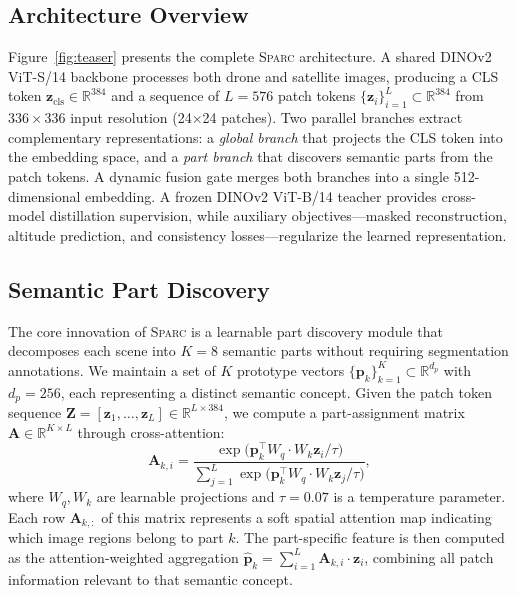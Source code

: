 \documentclass[sigconf, anonymous, review]{acmart}
\newcommand{\ours}{\textsc{Sparc}}
\newcommand{\reals}{\mathbb{R}}
\begin{document}
\subsection{Architecture Overview}
\label{sec:overview}

Figure~\ref{fig:teaser} presents the complete \ours{} architecture.
A shared DINOv2 ViT-S/14 backbone processes both drone and satellite images, producing a CLS token $\mathbf{z}_\text{cls} \in \reals^{384}$ and a sequence of $L{=}576$ patch tokens $\{\mathbf{z}_i\}_{i=1}^L \subset \reals^{384}$ from $336{\times}336$ input resolution (24${\times}$24 patches).
Two parallel branches extract complementary representations: a \emph{global branch} that projects the CLS token into the embedding space, and a \emph{part branch} that discovers semantic parts from the patch tokens.
A dynamic fusion gate merges both branches into a single 512-dimensional embedding.
A frozen DINOv2 ViT-B/14 teacher provides cross-model distillation supervision, while auxiliary objectives---masked reconstruction, altitude prediction, and consistency losses---regularize the learned representation.

\subsection{Semantic Part Discovery}
\label{sec:parts}

The core innovation of \ours{} is a learnable part discovery module that decomposes each scene into $K{=}8$ semantic parts without requiring segmentation annotations.
We maintain a set of $K$ prototype vectors $\{\mathbf{p}_k\}_{k=1}^K \subset \reals^{d_p}$ with $d_p{=}256$, each representing a distinct semantic concept.
Given the patch token sequence $\mathbf{Z} = [\mathbf{z}_1, \ldots, \mathbf{z}_L] \in \reals^{L \times 384}$, we compute a part-assignment matrix $\mathbf{A} \in \reals^{K \times L}$ through cross-attention:
\begin{equation}
\mathbf{A}_{k,i} = \frac{\exp\bigl(\mathbf{p}_k^\top W_q \cdot W_k \mathbf{z}_i / \tau\bigr)}{\sum_{j=1}^{L} \exp\bigl(\mathbf{p}_k^\top W_q \cdot W_k \mathbf{z}_j / \tau\bigr)},
\label{eq:assignment}
\end{equation}
where $W_q, W_k$ are learnable projections and $\tau{=}0.07$ is a temperature parameter.
Each row $\mathbf{A}_{k,:}$ of this matrix represents a soft spatial attention map indicating which image regions belong to part $k$.
The part-specific feature is then computed as the attention-weighted aggregation $\hat{\mathbf{p}}_k = \sum_{i=1}^L \mathbf{A}_{k,i} \cdot \mathbf{z}_i$, combining all patch information relevant to that semantic concept.
\end{document}
